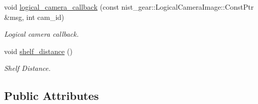 \begin{DoxyCompactItemize}
void \hyperlink{classBuildClass_a4d13438a582e88a6813385460d3c1a7f}{logical\+\_\+camera\+\_\+callback} (const nist\+\_\+gear\+::\+Logical\+Camera\+Image\+::\+Const\+Ptr \&msg, int cam\+\_\+id)
\begin{DoxyCompactList}\small\item\em Logical camera callback. \end{DoxyCompactList}\item 
void \hyperlink{classBuildClass_a5bcdfe5bfb567e511d397f02fd98e902}{shelf\+\_\+distance} ()
\begin{DoxyCompactList}\small\item\em Shelf Distance. \end{DoxyCompactList}\end{DoxyCompactItemize}
\subsection*{Public Attributes}
